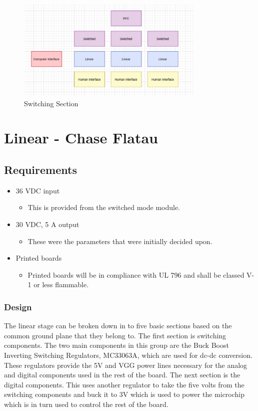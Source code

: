 \documentclass[12pt]{article}
\begin{document}
\begin{figure}[H]
    \centering
    \includegraphics[width=0.8\textwidth]{chase1}
    \caption{Switching Section}
    \label{fig:chase1}
\end{figure}

\section{Linear - Chase Flatau}

\subsection{Requirements}
\begin{itemize}
\item 36 VDC input \begin{itemize}
    \item This is provided from the switched mode module.
\end{itemize}
\item 30 VDC, 5 A output \begin{itemize}
    \item These were the parameters that were initially decided upon.
\end{itemize}
\item Printed boards \begin{itemize}
    \item Printed boards will be in compliance with UL 796 and shall be classed V-1 or less flammable.
\end{itemize}
\end{itemize}

\subsubsection{Design}
The linear stage can be broken down in to five basic sections based on the common ground plane that they belong to. The first section is switching components. The two main components in this group are the Buck Boost Inverting Switching Regulators, MC33063A, which are used for dc-dc conversion. These regulators provide the 5V and VGG power lines necessary for the analog and digital components used in the rest of the board. The next section is the digital components. This uses another regulator to take the five volts from the switching components and buck it to 3V which is used to power the microchip which is in turn used to control the rest of the board.\\
\end{document}
